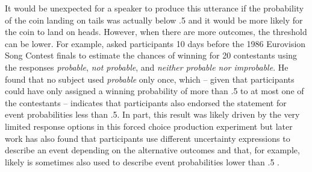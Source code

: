 \noindent It would be unexpected for a speaker to produce this utterance if the probability of the coin landing on tails was actually
below .5 and it would be more likely for the coin to land on heads. However, when there are more outcomes, the threshold can be lower.
For example, \cite{Teigen1988} asked participants 10 days before the 1986 Eurovision Song Contest finals to estimate the chances of winning for 
20 contestants using the responses \textit{probable}, \textit{not probable}, and \textit{neither probable nor improbable}.  He found that no subject
used \textit{probable} only once, which -- given that participants could have only assigned a winning probability of more than .5 to at most one of the contestants --
indicates that participants also endorsed the statement for event probabilities less than .5. In part, this result was likely driven by the very limited response options
in this forced choice production experiment but later work has also found that participants use different uncertainty expressions to describe an event depending on the
alternative outcomes and that, for example, likely is sometimes also used to describe event probabilities lower than .5 \cite{e.g.,  WindshitlandWells1998}.

